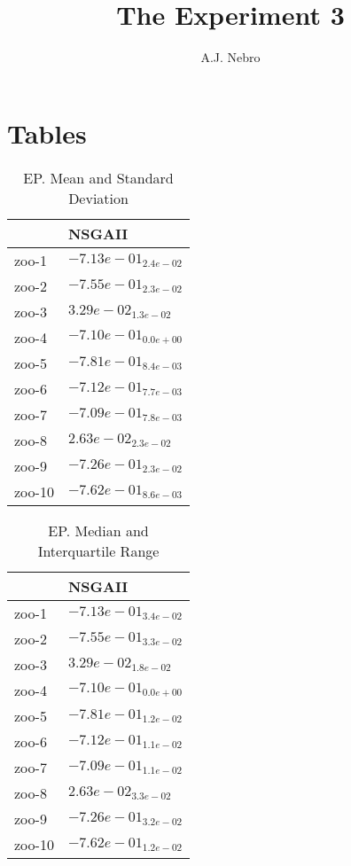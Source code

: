 \documentclass{article}
\title{The Experiment 3}
\author{A.J. Nebro}
\begin{document}
\maketitle
\section{Tables}

\begin{table}
\caption{EP. Mean and Standard Deviation}
\label{table: EP}
\centering
\begin{scriptsize}
\begin{tabular}{ll}
\hline &  NSGAII\\
\hline 
zoo-1 & \cellcolor{gray95}$ -7.13e-01_{ 2.4e-02}$ \\
zoo-2 & \cellcolor{gray95}$ -7.55e-01_{ 2.3e-02}$ \\
zoo-3 & \cellcolor{gray95}$  3.29e-02_{ 1.3e-02}$ \\
zoo-4 & \cellcolor{gray95}$ -7.10e-01_{ 0.0e+00}$ \\
zoo-5 & \cellcolor{gray95}$ -7.81e-01_{ 8.4e-03}$ \\
zoo-6 & \cellcolor{gray95}$ -7.12e-01_{ 7.7e-03}$ \\
zoo-7 & \cellcolor{gray95}$ -7.09e-01_{ 7.8e-03}$ \\
zoo-8 & \cellcolor{gray95}$  2.63e-02_{ 2.3e-02}$ \\
zoo-9 & \cellcolor{gray95}$ -7.26e-01_{ 2.3e-02}$ \\
zoo-10 & \cellcolor{gray95}$ -7.62e-01_{ 8.6e-03}$ \\
\hline
\end{tabular}
\end{scriptsize}
\end{table}

\begin{table}
\caption{EP. Median and Interquartile Range}
\label{table: EP}
\centering
\begin{scriptsize}
\begin{tabular}{ll}
\hline &  NSGAII\\
\hline 
zoo-1 & \cellcolor{gray95}$ -7.13e-01_{ 3.4e-02}$ \\
zoo-2 & \cellcolor{gray95}$ -7.55e-01_{ 3.3e-02}$ \\
zoo-3 & \cellcolor{gray95}$  3.29e-02_{ 1.8e-02}$ \\
zoo-4 & \cellcolor{gray95}$ -7.10e-01_{ 0.0e+00}$ \\
zoo-5 & \cellcolor{gray95}$ -7.81e-01_{ 1.2e-02}$ \\
zoo-6 & \cellcolor{gray95}$ -7.12e-01_{ 1.1e-02}$ \\
zoo-7 & \cellcolor{gray95}$ -7.09e-01_{ 1.1e-02}$ \\
zoo-8 & \cellcolor{gray95}$  2.63e-02_{ 3.3e-02}$ \\
zoo-9 & \cellcolor{gray95}$ -7.26e-01_{ 3.2e-02}$ \\
zoo-10 & \cellcolor{gray95}$ -7.62e-01_{ 1.2e-02}$ \\
\hline
\end{tabular}
\end{scriptsize}
\end{table}
\end{document}
